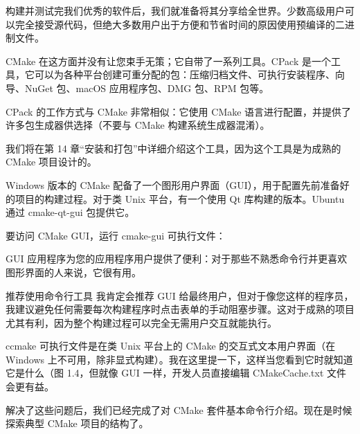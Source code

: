 
构建并测试完我们优秀的软件后，我们就准备将其分享给全世界。少数高级用户可以完全接受源代码，但绝大多数用户出于方便和节省时间的原因使用预编译的二进制文件。

CMake 在这方面并没有让您束手无策；它自带了一系列工具。CPack 是一个工具，它可以为各种平台创建可重分配的包：压缩归档文件、可执行安装程序、向导、NuGet 包、macOS 应用程序包、DMG 包、RPM 包等。

CPack 的工作方式与 CMake 非常相似：它使用 CMake 语言进行配置，并提供了许多包生成器供选择（不要与 CMake 构建系统生成器混淆）。

我们将在第 14 章“安装和打包”中详细介绍这个工具，因为这个工具是为成熟的 CMake 项目设计的。


Windows 版本的 CMake 配备了一个图形用户界面（GUI），用于配置先前准备好的项目的构建过程。对于类 Unix 平台，有一个使用 Qt 库构建的版本。Ubuntu 通过 cmake-qt-gui 包提供它。

要访问 CMake GUI，运行 cmake-gui 可执行文件：


GUI 应用程序为您的应用程序用户提供了便利：对于那些不熟悉命令行并更喜欢图形界面的人来说，它很有用。

\begin{myNotic}{推荐使用命令行工具}
我肯定会推荐 GUI 给最终用户，但对于像您这样的程序员，我建议避免任何需要每次构建程序时点击表单的手动阻塞步骤。这对于成熟的项目尤其有利，因为整个构建过程可以完全无需用户交互就能执行。
\end{myNotic}


ccmake 可执行文件是在类 Unix 平台上的 CMake 的交互式文本用户界面（在 Windows 上不可用，除非显式构建）。我在这里提一下，这样当您看到它时就知道它是什么（图 1.4，但就像 GUI 一样，开发人员直接编辑 CMakeCache.txt 文件会更有益。


解决了这些问题后，我们已经完成了对 CMake 套件基本命令行介绍。现在是时候探索典型 CMake 项目的结构了。

















